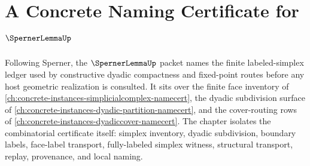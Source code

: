 \chapter{A Concrete Naming Certificate for $\SpernerLemmaUp$}
\label{ch:concrete-instances-sperner-lemma-namecert}

Following Sperner, the $\SpernerLemmaUp$ packet names the finite labeled-simplex ledger used by constructive dyadic compactness and fixed-point routes before any host geometric realization is consulted. It sits over the finite face inventory of \autoref{ch:concrete-instances-simplicialcomplex-namecert}, the dyadic subdivision surface of \autoref{ch:concrete-instances-dyadic-partition-namecert}, and the cover-routing rows of \autoref{ch:concrete-instances-dyadiccover-namecert}. The chapter isolates the combinatorial certificate itself: simplex inventory, dyadic subdivision, boundary labels, face-label transport, fully-labeled simplex witness, structural transport, replay, provenance, and local naming.

